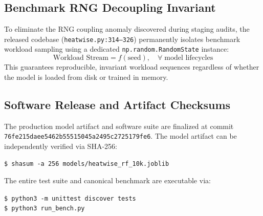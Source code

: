 \documentclass[conference,10pt]{IEEEtran}
\begin{document}
\vspace{-4pt}
\label{sec:appendix}

\subsection{Benchmark RNG Decoupling Invariant}
To eliminate the RNG coupling anomaly discovered during staging audits, the released codebase (\texttt{heatwise.py:314--326}) permanently isolates benchmark workload sampling using a dedicated \texttt{np.random.RandomState} instance:
\begin{equation}
\text{Workload Stream} = f(\text{seed}), \quad \forall \; \text{model lifecycles}
\end{equation}
This guarantees reproducible, invariant workload sequences regardless of whether the model is loaded from disk or trained in memory.

\subsection{Software Release and Artifact Checksums}
The production model artifact and software suite are finalized at commit \texttt{76fe215daee5462b55515045a2495c2725179fe6}. The model artifact can be independently verified via SHA-256:

\vspace{2pt}
\noindent\texttt{\$ shasum -a 256 models/heatwise\_rf\_10k.joblib}\\

\vspace{3pt}
The entire test suite and canonical benchmark are executable via:

\vspace{2pt}
\noindent\texttt{\$ python3 -m unittest discover tests}\\
\noindent\texttt{\$ python3 run\_bench.py}

\vspace{-6pt}


\end{document}
